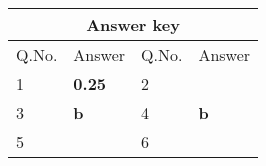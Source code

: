\setlength\arrayrulewidth{1pt}
\begin{table}[H]
	\centering
	\begin{tabular}{|p{1.5cm}|p{1.5cm}||p{1.5cm}|p{1.5cm}|}
		\hline
		\multicolumn{4}{|c|}{\textbf{Answer key}}\\\hline\hline
		\rowcolor{ocrel}Q.No.&Answer&Q.No.&Answer\\\hline
		1&\textbf{0.25} &2&\textbf{}\\\hline 
		3&\textbf{b} &4&\textbf{b} \\\hline
		5&\textbf{} &6&\textbf{} \\\hline
		
	\end{tabular}
\end{table}















